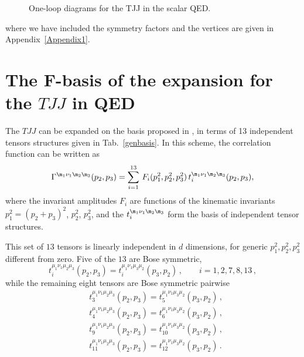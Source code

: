 \documentclass[a4paper,11pt,openright,twoside]{book}
\let\n=\nu      \let\x=\xi     \let\p=\pi      \let\r=\rho
\newcommand{\tabref}[1]{Tab.~\ref{#1}}			%
\newcommand{\appref}[1]{Appendix~\ref{#1}}		%
\numberwithin{equation}{section}
\begin{document}
{{\begin{figure}[t]
	\vspace{-1.3cm}
	\hspace{.3cm}
	 \hspace{.3cm}
	\hspace{.3cm}
	\hspace{.3cm}
	\vspace{-0.8cm}\caption{One-loop diagrams for the TJJ in the scalar QED. \label{Figura1bis}}
\end{figure}
where we have included the symmetry factors and the vertices are given in \appref{Appendix1}. 

\section{ The F-basis of the expansion for the $TJJ$ in QED}
The $TJJ$ can be expanded on the basis proposed in \cite{Giannotti:2008cv}, in terms of 13 independent tensors structures given in \tabref{genbasis}. In this scheme, the correlation function can be written as
\begin{equation}
	\Gamma^{\m_1\n_1\m_2\m_3}(p_2,p_3)=\sum_{i=1}^{13}\,F_i(p_1^2,p_2^2,p_3^2)\,t_i^{\m_1\n_1\m_2\m_3}(p_2,p_3),
\end{equation} 
where the invariant amplitudes $F_i$ are functions of the kinematic invariants $p_1^2=(p_2+p_3)^2$, $p_2^2$, $p_3^2$, and the $t_i^{\m_1\n_1\m_2\m_3}$ form the basis of independent tensor structures. 

This set of $13$ tensors is linearly independent in $d$ dimensions, for generic $p_1^2, p_2^2, p_3^2$ different from zero. Five of the $13$ are Bose symmetric, 
\begin{equation}
	t_i^{\mu_1\nu_1\mu_2\mu_3}(p_2,p_3) = t_i^{\mu_1\nu_1\mu_3\mu_2}(p_3,p_2)\,,\qquad i=1,2,7,8,13\,,
\end{equation}
while the remaining eight tensors are Bose symmetric pairwise
\begin{align}
	\label{pair}
	&t_3^{\mu_1\nu_1\mu_2\mu_3}(p_2,p_3) = t_5^{\mu_1\nu_1\mu_3\mu_2}(p_3,p_2)\,,\\
	&t_4^{\mu_1\nu_1\mu_2\mu_3}(p_2,p_3)= t_6^{\mu_1\nu_1\mu_3\mu_2}(p_3,p_2)\,,\\
	&t_9^{\mu_1\nu_1\mu_2\mu_3}(p_2,p_3) = t_{10}^{\mu_1\nu_1\mu_3\mu_2}(p_3,p_2)\,,\\
	&t_{11}^{\mu_1\nu_1\mu_2\mu_3}(p_2,p_3) = t_{12}^{\mu_1\nu_1\mu_3\mu_2}(p_3,p_2)\,.
\end{align}

}}
\end{document}
